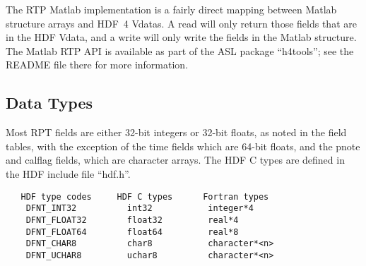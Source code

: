 \documentclass[12pt]{article}
\begin{document}
The RTP Matlab implementation is a fairly direct mapping between
Matlab structure arrays and HDF~4 Vdatas.  A read will only return
those fields that are in the HDF Vdata, and a write will only write
the fields in the Matlab structure.  The Matlab RTP API is available
as part of the ASL package ``h4tools''; see the README file there
for more information.


\subsection{Data Types}

Most RPT fields are either 32-bit integers or 32-bit floats, as
noted in the field tables, with the exception of the time fields
which are 64-bit floats, and the pnote and calflag fields, which are
character arrays.  The HDF C types are defined in the HDF include
file ``hdf.h''.

{\small
\begin{verbatim}
   HDF type codes     HDF C types      Fortran types
    DFNT_INT32          int32           integer*4
    DFNT_FLOAT32        float32         real*4
    DFNT_FLOAT64        float64         real*8
    DFNT_CHAR8          char8           character*<n>
    DFNT_UCHAR8         uchar8          character*<n>
\end{verbatim}
}
\end{document}
